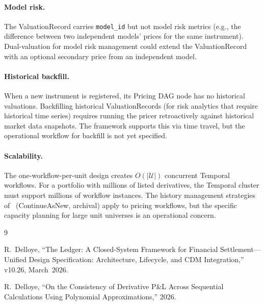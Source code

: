 \documentclass[11pt,a4paper]{article}
\begin{document}
\paragraph{Model risk.}  The ValuationRecord carries \texttt{model\_id} but not model risk metrics (e.g., the difference between two independent models' prices for the same instrument).  Dual-valuation for model risk management could extend the ValuationRecord with an optional secondary price from an independent model.

\paragraph{Historical backfill.}  When a new instrument is registered, its Pricing DAG node has no historical valuations.  Backfilling historical ValuationRecords (for risk analytics that require historical time series) requires running the pricer retroactively against historical market data snapshots.  The framework supports this via time travel, but the operational workflow for backfill is not yet specified.

\paragraph{Scalability.}  The one-workflow-per-unit design creates $O(|\mathcal{U}|)$ concurrent Temporal workflows.  For a portfolio with millions of listed derivatives, the Temporal cluster must support millions of workflow instances.  The history management strategies of~\cite[\S14.12]{ledger} (ContinueAsNew, archival) apply to pricing workflows, but the specific capacity planning for large unit universes is an operational concern.

\clearpage
\begin{thebibliography}{9}

R.~Delloye, ``The Ledger: A Closed-System Framework for Financial Settlement---Unified Design Specification: Architecture, Lifecycle, and CDM Integration,'' v10.26, March~2026.

R.~Delloye, ``On the Consistency of Derivative P\&L Across Sequential Calculations Using Polynomial Approximations,'' 2026.

\end{thebibliography}
\end{document}

